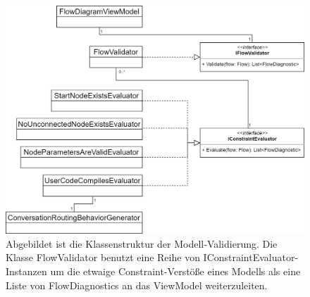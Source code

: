 \begin{figure} %
	\centering
		\includegraphics[width=\textwidth]{img/FlowValidatorClassStructure.png}
	\caption[Klassenstruktur der Modell-Validierung]{Abgebildet ist die Klassenstruktur der Modell-Validierung. Die Klasse FlowValidator benutzt eine Reihe von IConstraintEvaluator-Instanzen um die etwaige Constraint-Verstöße eines Modells als eine Liste von FlowDiagnostics an das ViewModel weiterzuleiten.}
	\label{fig:UML:FlowValidatorClassStructure}
\end{figure}